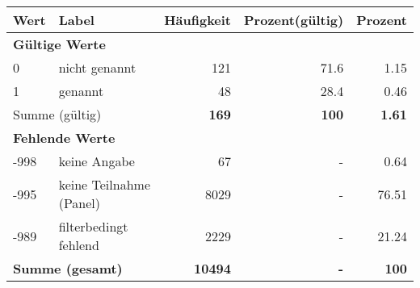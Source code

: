      \begin{longtable}{lXrrr}
     \toprule
     \textbf{Wert} & \textbf{Label} & \textbf{Häufigkeit} & \textbf{Prozent(gültig)} & \textbf{Prozent} \\
     \endhead
     \midrule
     \multicolumn{5}{l}{\textbf{Gültige Werte}}\\

     0 &
     \multicolumn{1}{X}{ nicht genannt   } &


       \num{121} &
       \num[round-mode=places,round-precision=2]{71.6} &
         \num[round-mode=places,round-precision=2]{1.15} \\

     1 &
     \multicolumn{1}{X}{ genannt   } &


       \num{48} &
       \num[round-mode=places,round-precision=2]{28.4} &
         \num[round-mode=places,round-precision=2]{0.46} \\
     \midrule
     \multicolumn{2}{l}{Summe (gültig)} &
       \textbf{\num{169}} &
     \textbf{\num{100}} &
       \textbf{\num[round-mode=places,round-precision=2]{1.61}} \\
     \multicolumn{5}{l}{\textbf{Fehlende Werte}}\\
       -998 &
       keine Angabe &
         \num{67} &
        - &
         \num[round-mode=places,round-precision=2]{0.64} \\
       -995 &
       keine Teilnahme (Panel) &
         \num{8029} &
        - &
         \num[round-mode=places,round-precision=2]{76.51} \\
       -989 &
       filterbedingt fehlend &
         \num{2229} &
        - &
         \num[round-mode=places,round-precision=2]{21.24} \\
     \midrule
     \multicolumn{2}{l}{\textbf{Summe (gesamt)}} &
          \textbf{\num{10494}} &
        \textbf{-} &
        \textbf{\num{100}} \\
     \bottomrule
     \end{longtable}
     
